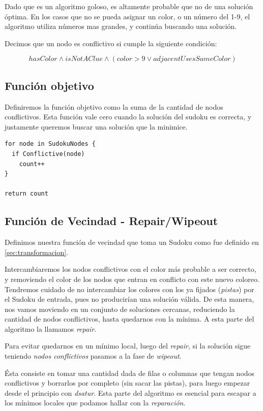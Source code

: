 \documentclass[a4paper,spanish]{article}
\begin{document}
Dado que es un algoritmo goloso, es altamente probable que no de una solución óptima.
En los casos que no se pueda asignar un color, o un número del 1-9, el algoritmo
utiliza números mas grandes, y continúa buscando una solución.

Decimos que un nodo es conflictivo si cumple la siguiente condición:

\begin{equation}
    hasColor \wedge isNotAClue \wedge ( color > 9 \vee adjacentUsesSameColor)
\end{equation}

\subsection{Función objetivo}

Definiremos la función objetivo como la suma de la cantidad de nodos conflictivos. 
Esta función vale cero cuando la solución del sudoku es correcta, y justamente queremos
buscar una solución que la minimice.

\begin{Verbatim}[samepage=true]
for node in SudokuNodes {
  if Conflictive(node)
    count++
}

return count
\end{Verbatim}


\subsection{Función de Vecindad - Repair/Wipeout}

Definimos nuestra función de vecindad que toma un Sudoku como fue
definido en \ref{sec:transformacion}.

Intercambiaremos los nodos conflictivos con el color más probable a ser correcto,
y removiendo el color de los nodos que entran en conflicto con este nuevo coloreo.
Tendremos cuidado de no intercambiar los colores con los ya fijados (\emph{pistas})
por el Sudoku de entrada, pues no producirían una solución válida.
De esta manera, nos vamos moviendo en un conjunto de soluciones cercanas, reduciendo
la cantidad de nodos conflictivos, hasta quedarnos con la mínima.
A esta parte del algoritmo la llamamos \emph{repair}.

Para evitar quedarnos en un mínimo local, luego del \emph{repair}, si la solución
sigue teniendo \textit{nodos conflictivos} pasamos a la fase de \emph{wipeout}.

Ésta consiste en tomar una cantidad dada de filas o columnas que tengan nodos
conflictivos y borrarlos por completo (sin sacar las pistas), para luego empezar
desde el principio con \emph{dsatur}. Esta parte del algoritmo es esencial para escapar
a los mínimos locales que podamos hallar con la \textit{reparación}.
\end{document}
